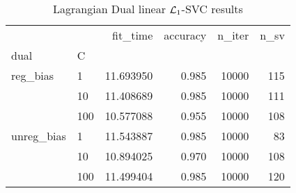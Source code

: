 \begin{table}[H]
\centering
\caption{Lagrangian Dual linear $\protect \mathcal{L}_1$-SVC results}
\label{linear_lagrangian_dual_l1_svc_cv_results}
\begin{tabular}{llrrrr}
\toprule
           &     &   fit\_time &  accuracy &  n\_iter &  n\_sv \\
dual & C &            &           &         &       \\
\midrule
reg\_bias & 1   &  11.693950 &     0.985 &   10000 &   115 \\
           & 10  &  11.408689 &     0.985 &   10000 &   111 \\
           & 100 &  10.577088 &     0.955 &   10000 &   108 \\
unreg\_bias & 1   &  11.543887 &     0.985 &   10000 &    83 \\
           & 10  &  10.894025 &     0.970 &   10000 &   108 \\
           & 100 &  11.499404 &     0.985 &   10000 &   120 \\
\bottomrule
\end{tabular}
\end{table}
